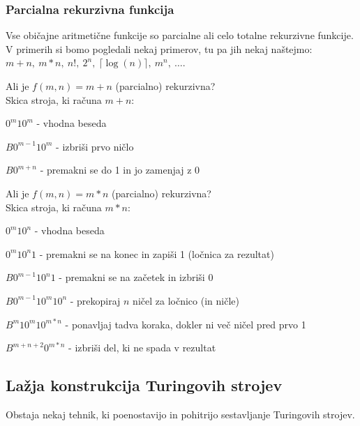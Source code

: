\documentclass[10pt,a4paper,oneside]{book}
\begin{document}
\subsubsection{Parcialna rekurzivna funkcija}
Vse običajne aritmetične funkcije so parcialne ali celo totalne rekurzivne funkcije. V primerih si bomo pogledali nekaj primerov, tu pa jih nekaj naštejmo: $m+n,\ m*n,\ n!,\ 2^n,\ \lceil \log(n) \rceil,\ m^n,\ \dots$.
\begin{primeri}
\item
    Ali je $f(m,n)=m+n$ (parcialno) rekurzivna?\\
    Skica stroja, ki računa $m+n$:
    \begin{items}
    \item $0^m 1 0^m$ - vhodna beseda
    \item $B0^{m-1} 1 0^m$ - izbriši prvo ničlo
    \item $B0^{m+n}$ - premakni se do 1 in jo zamenjaj z 0
    \end{items}%
\item
    Ali je $f(m,n)=m*n$ (parcialno) rekurzivna?\\
    Skica stroja, ki računa $m*n$:
    \begin{items}
    \item $0^m 1 0^n$ - vhodna beseda
    \item $0^m 1 0^n 1$ - premakni se na konec in zapiši 1 (ločnica za rezultat)
    \item $B 0^{m-1} 1 0^n 1$ - premakni se na začetek in izbriši 0
    \item $B 0^{m-1} 1 0^m 1 0^n$ - prekopiraj $n$ ničel za ločnico (in ničle)
    \item $B^{m} 1 0^m 1 0^{m*n}$ - ponavljaj tadva koraka, dokler ni več ničel pred prvo 1
    \item $B^{m+n+2}0^{m*n}$ - izbriši del, ki ne spada v rezultat 
    \end{items}%
\end{primeri}

\subsection{Lažja konstrukcija Turingovih strojev}
Obstaja nekaj tehnik, ki poenostavijo in pohitrijo sestavljanje Turingovih strojev.%
\end{document}
